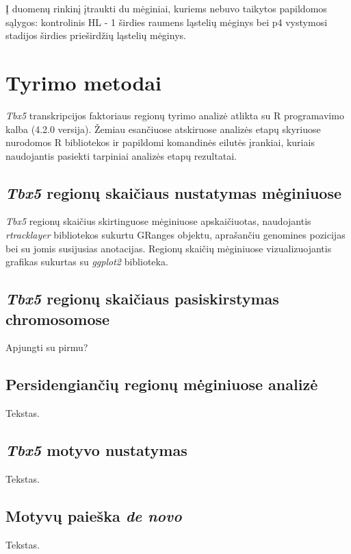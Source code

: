 \documentclass[11pt]{article}
\begin{document}
Į duomenų rinkinį įtraukti du mėginiai, kuriems nebuvo taikytos papildomos
sąlygos: kontrolinis HL - 1 širdies raumens ląstelių mėginys bei p4
vystymosi stadijos širdies prieširdžių ląstelių mėginys.
\newpage


\section{Tyrimo metodai}
\emph{Tbx5} transkripcijos faktoriaus regionų tyrimo analizė atlikta
su R programavimo kalba (4.2.0 versija). Žemiau esančiuose atskiruose
analizės etapų skyriuose nurodomos R bibliotekos ir papildomi komandinės
eilutės įrankiai, kuriais naudojantis pasiekti tarpiniai analizės etapų
rezultatai.

\subsection{\emph{Tbx5} regionų skaičiaus nustatymas mėginiuose}
\emph{Tbx5} regionų skaičius skirtinguose mėginiuose apskaičiuotas,
naudojantis \emph{rtracklayer}  bibliotekos sukurtu GRanges objektu,
aprašančiu genomines pozicijas bei su jomis susijusias anotacijas.
Regionų skaičių mėginiuose vizualizuojantis grafikas sukurtas su
\emph{ggplot2} biblioteka.

\subsection{\emph{Tbx5} regionų skaičiaus pasiskirstymas chromosomose}
Apjungti su pirmu?

\subsection{Persidengiančių regionų mėginiuose analizė}
Tekstas.

\subsection{\emph{Tbx5} motyvo nustatymas}
Tekstas.

\subsection{Motyvų paieška \emph{de novo}}
Tekstas.



\newpage
\end{document}
